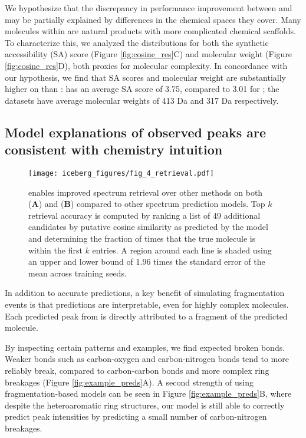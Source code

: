 \documentclass[journal=jcim,manuscript=article]{achemso}
\begin{document}
We hypothesize that the discrepancy in performance improvement between \gnpsData and \nistData may be  partially explained by differences in the chemical spaces they cover. %
Many molecules within \gnpsData are natural products with more complicated chemical scaffolds. To characterize this, we analyzed the distributions for both the synthetic accessibility (SA) score \cite{ertl2009estimation, huang2022artificial} (Figure \ref{fig:cosine_res}C) and molecular weight (Figure \ref{fig:cosine_res}D), both proxies for molecular complexity. In concordance with our hypothesis, we find that SA scores and molecular weight are substantially higher on \gnpsData than \nistData: \gnpsData has an average SA score of 3.75, compared to 3.01 for \nistData; the datasets have average molecular weights of 413 Da and 317 Da respectively. %


\subsection{Model explanations of observed peaks are consistent with chemistry intuition}
\label{sec:spec_interpret}


\begin{figure}
  \centering
  \vspace{-1em}
  \texttt{[image: iceberg\_figures/fig\_4\_retrieval.pdf]}
  \caption{\ourModel enables improved spectrum retrieval over other methods on both \gnpsData (\textbf{A}) and \nistData (\textbf{B}) compared to other  spectrum prediction models. Top $k$ retrieval accuracy is computed by ranking a list of 49 additional candidates by putative cosine similarity as predicted by the model and determining the fraction of times that the true molecule is within the first $k$ entries. A region around each line is shaded using an upper and lower bound of 1.96 times the standard error of the mean across training seeds.}
\label{fig:retrieval}
\end{figure}


In addition to accurate predictions, a key benefit of simulating fragmentation events is that predictions are interpretable, even for  highly complex molecules. Each predicted peak from \ourModel is directly attributed to a fragment of the predicted molecule.


 By inspecting certain patterns and examples, we find expected broken bonds. Weaker bonds such as carbon-oxygen and carbon-nitrogen bonds tend to more reliably break, compared to carbon-carbon bonds and more complex ring breakages (Figure \ref{fig:example_preds}A). A second strength of using fragmentation-based models can be seen in
Figure \ref{fig:example_preds}B, where despite the heteroaromatic ring structures, our model is still able to correctly predict peak intensities by predicting a small number of carbon-nitrogen breakages.
\end{document}
